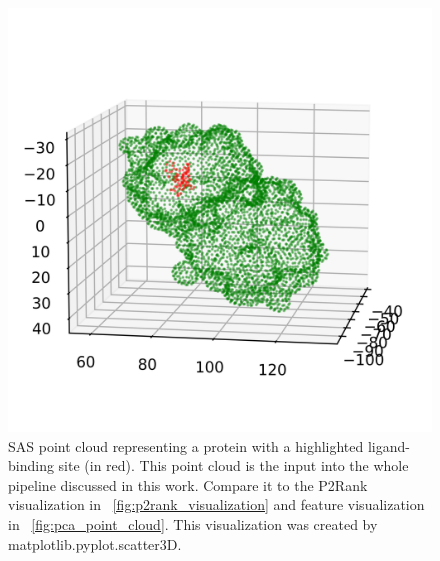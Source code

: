 \begin{figure}
    \centering
    \includegraphics[width=1\linewidth]{point_cloud_class.png}
    \caption{SAS point cloud representing a protein with a highlighted ligand-binding site (in red). This point cloud is the input into the whole pipeline discussed in this work. Compare it to the P2Rank visualization in ~\ref{fig:p2rank_visualization} and feature visualization in 
    ~\ref{fig:pca_point_cloud}. This visualization was created by matplotlib.pyplot.scatter3D.}
    \label{fig:class_point_cloud}
\end{figure}

